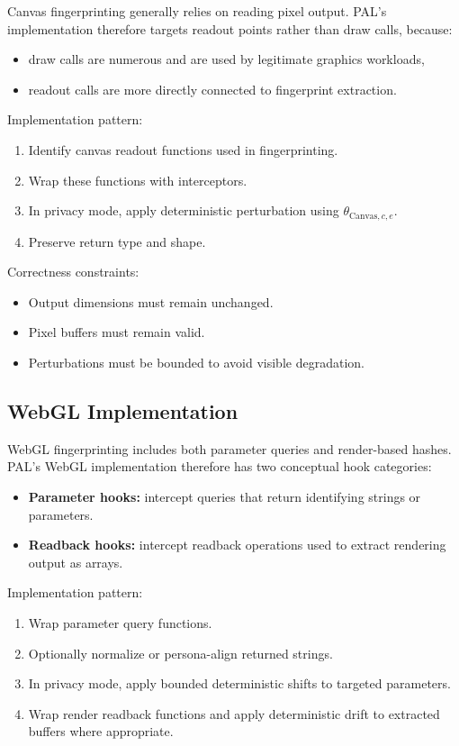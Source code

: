 \documentclass[11pt]{report}
\begin{document}
Canvas fingerprinting generally relies on reading pixel output. PAL’s implementation therefore targets readout points rather than draw calls, because:

\begin{itemize}
    \item draw calls are numerous and are used by legitimate graphics workloads,
    \item readout calls are more directly connected to fingerprint extraction.
\end{itemize}

Implementation pattern:
\begin{enumerate}
    \item Identify canvas readout functions used in fingerprinting.
    \item Wrap these functions with interceptors.
    \item In privacy mode, apply deterministic perturbation using $\theta_{\text{Canvas},c,e}$.
    \item Preserve return type and shape.
\end{enumerate}

Correctness constraints:
\begin{itemize}
    \item Output dimensions must remain unchanged.
    \item Pixel buffers must remain valid.
    \item Perturbations must be bounded to avoid visible degradation.
\end{itemize}

\subsection{WebGL Implementation}

WebGL fingerprinting includes both parameter queries and render-based hashes. PAL’s WebGL implementation therefore has two conceptual hook categories:

\begin{itemize}
    \item \textbf{Parameter hooks:} intercept queries that return identifying strings or parameters.
    \item \textbf{Readback hooks:} intercept readback operations used to extract rendering output as arrays.
\end{itemize}

Implementation pattern:
\begin{enumerate}
    \item Wrap parameter query functions.
    \item Optionally normalize or persona-align returned strings.
    \item In privacy mode, apply bounded deterministic shifts to targeted parameters.
    \item Wrap render readback functions and apply deterministic drift to extracted buffers where appropriate.
\end{enumerate}
\end{document}
